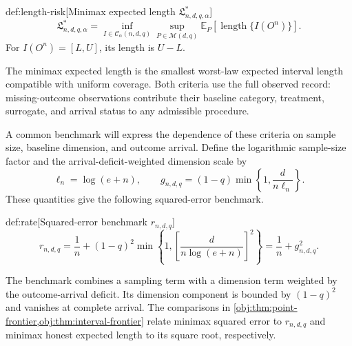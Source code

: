 \begin{definitionv}{def:length-risk}[Minimax expected length \(\mathfrak L^*_{n,d,q,\alpha}\)]
\[
\mathfrak L^*_{n,d,q,\alpha}
=
\inf_{I\in\mathcal C_\alpha(n,d,q)}
\sup_{P\in\mathcal M(d,q)}
\mathbb E_P
\left[
\operatorname{length}\{I(O^n)\}
\right].
\]
For \(I(O^n)=[L,U]\), its length is \(U-L\).
\end{definitionv}

The minimax expected length  is the smallest worst-law expected interval length compatible with uniform coverage. Both criteria use the full observed record: missing-outcome observations contribute their baseline category, treatment, surrogate, and arrival status to any admissible procedure.

A common benchmark will express the dependence of these criteria on sample size, baseline dimension, and outcome arrival. Define the logarithmic sample-size factor  and the arrival-deficit-weighted dimension scale  by
\[
\ell_n=\log(e+n),
\qquad
g_{n,d,q}=(1-q)\min\left\{1,\frac{d}{n\ell_n}\right\}.
\]
These quantities give the following squared-error benchmark.

\begin{definitionv}{def:rate}[Squared-error benchmark \(r_{n,d,q}\)]
\[
r_{n,d,q}
=
\frac{1}{n}
+
(1-q)^2
\min\left\{
1,
\left[\frac{d}{n\log(e+n)}\right]^2
\right\}
=
\frac{1}{n}+g_{n,d,q}^2.
\]
\end{definitionv}

The benchmark  combines a sampling term with a dimension term weighted by the outcome-arrival deficit. Its dimension component is bounded by \((1-q)^2\) and vanishes at complete arrival. The comparisons in \cref{obj:thm:point-frontier,obj:thm:interval-frontier} relate minimax squared error to \(r_{n,d,q}\) and minimax honest expected length to its square root, respectively.
